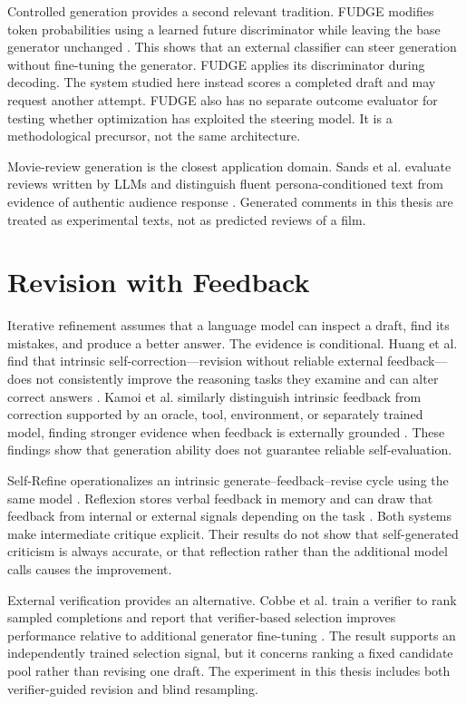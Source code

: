 Controlled generation provides a second relevant tradition. FUDGE modifies token probabilities using a learned future discriminator while leaving the base generator unchanged \cite{b11}. This shows that an external classifier can steer generation without fine-tuning the generator. FUDGE applies its discriminator during decoding. The system studied here instead scores a completed draft and may request another attempt. FUDGE also has no separate outcome evaluator for testing whether optimization has exploited the steering model. It is a methodological precursor, not the same architecture.

Movie-review generation is the closest application domain. Sands et al. evaluate reviews written by LLMs and distinguish fluent persona-conditioned text from evidence of authentic audience response \cite{b12}. Generated comments in this thesis are treated as experimental texts, not as predicted reviews of a film.

\section{Revision with Feedback}
\label{sec:self-correction-feedback}

Iterative refinement assumes that a language model can inspect a draft, find its mistakes, and produce a better answer. The evidence is conditional. Huang et al. find that intrinsic self-correction—revision without reliable external feedback—does not consistently improve the reasoning tasks they examine and can alter correct answers \cite{b5}. Kamoi et al. similarly distinguish intrinsic feedback from correction supported by an oracle, tool, environment, or separately trained model, finding stronger evidence when feedback is externally grounded \cite{b6}. These findings show that generation ability does not guarantee reliable self-evaluation.

Self-Refine operationalizes an intrinsic generate–feedback–revise cycle using the same model \cite{b13}. Reflexion stores verbal feedback in memory and can draw that feedback from internal or external signals depending on the task \cite{b14}. Both systems make intermediate critique explicit. Their results do not show that self-generated criticism is always accurate, or that reflection rather than the additional model calls causes the improvement.

External verification provides an alternative. Cobbe et al. train a verifier to rank sampled completions and report that verifier-based selection improves performance relative to additional generator fine-tuning \cite{b58}. The result supports an independently trained selection signal, but it concerns ranking a fixed candidate pool rather than revising one draft. The experiment in this thesis includes both verifier-guided revision and blind resampling.

